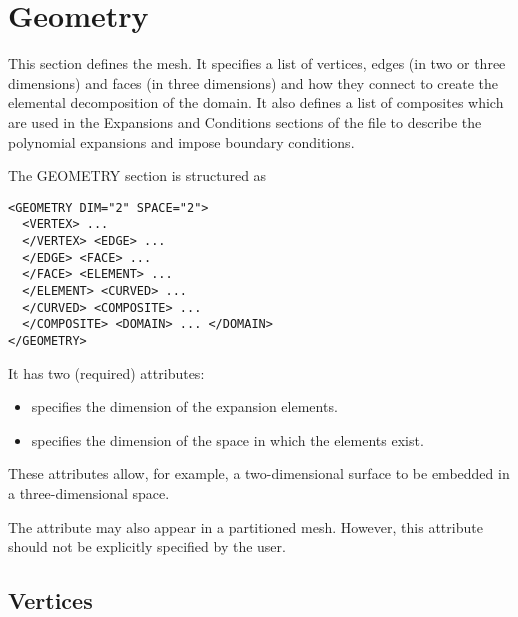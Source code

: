\section{Geometry}
This section defines the mesh. It specifies a list of vertices, edges (in two or
three dimensions) and faces (in three dimensions) and how they connect to create
the elemental decomposition of the domain. It also defines a list of composites
which are used in the Expansions and Conditions sections of the file to describe
the polynomial expansions and impose boundary conditions.

The GEOMETRY section is structured as \begin{lstlisting}[style=XMLStyle]
<GEOMETRY DIM="2" SPACE="2">
  <VERTEX> ...
  </VERTEX> <EDGE> ...
  </EDGE> <FACE> ...
  </FACE> <ELEMENT> ...
  </ELEMENT> <CURVED> ...
  </CURVED> <COMPOSITE> ...
  </COMPOSITE> <DOMAIN> ... </DOMAIN>
</GEOMETRY>
\end{lstlisting}
It has two (required) attributes:
\begin{itemize}
    \item {} specifies the dimension of the expansion elements.
    \item {} specifies the dimension of the space in which the
    elements exist.
\end{itemize}
These attributes allow, for example, a two-dimensional surface to be embedded in
a three-dimensional space. 

\begin{notebox}
The attribute  may also appear in a partitioned mesh.
However, this attribute should not be explicitly specified by the user.
\end{notebox}


\subsection{Vertices}

